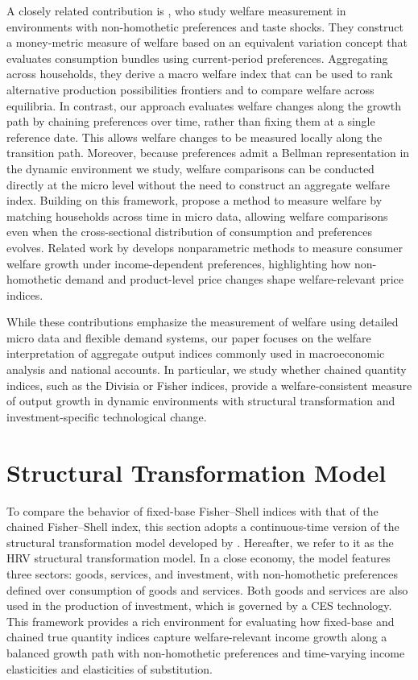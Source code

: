 \documentclass[12pt,a4paper]{article}
\begin{document}
A closely related contribution is \citet{BB2023welfare}, who study welfare measurement in environments with non-homothetic preferences and taste shocks. They construct a money-metric measure of welfare based on an equivalent variation concept that evaluates consumption bundles using current-period preferences. Aggregating across households, they derive a macro welfare index that can be used to rank alternative production possibilities frontiers and to compare welfare across equilibria. In contrast, our approach evaluates welfare changes along the growth path by chaining preferences over time, rather than fixing them at a single reference date. This allows welfare changes to be measured locally along the transition path. Moreover, because preferences admit a Bellman representation in the dynamic environment we study, welfare comparisons can be conducted directly at the micro level without the need to construct an aggregate welfare index. Building on this framework, \citet{Baqaee_Burstein_KoikeMori_2023} propose a method to measure welfare by matching households across time in micro data, allowing welfare comparisons even when the cross-sectional distribution of consumption and preferences evolves. Related work by \citet{Jaravel_Lashkari_2023} develops nonparametric methods to measure consumer welfare growth under income-dependent preferences, highlighting how non-homothetic demand and product-level price changes shape welfare-relevant price indices.

While these contributions emphasize the measurement of welfare using detailed micro data and flexible demand systems, our paper focuses on the welfare interpretation of aggregate output indices commonly used in macroeconomic analysis and national accounts. In particular, we study whether chained quantity indices, such as the Divisia or Fisher indices, provide a welfare-consistent measure of output growth in dynamic environments with structural transformation and investment-specific technological change.
\section{Structural Transformation Model} \label{sec:ST}

To compare the behavior of fixed-base Fisher–Shell indices with that of the chained Fisher–Shell index, this section adopts a continuous-time version of the structural transformation model developed by \cite{herrendorf_rogerson_valentinyi_2021}.  
Hereafter, we refer to it as the HRV structural transformation model.  
In a close economy, the model features three sectors: goods, services, and investment, with non-homothetic preferences defined over consumption of goods and services.  
Both goods and services are also used in the production of investment, which is governed by a CES technology.  
This framework provides a rich environment for evaluating how fixed-base and chained true quantity indices capture welfare-relevant income growth along a balanced growth path with non-homothetic preferences and time-varying income elasticities and elasticities of substitution.
\end{document}

